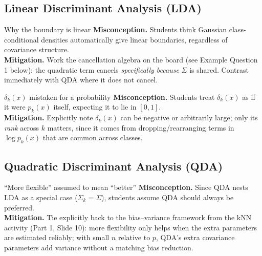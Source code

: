 \documentclass[11pt]{article}
\begin{document}
\subsection{Linear Discriminant Analysis (LDA)}
\begin{diffconcept}{Why the boundary is linear}
\textbf{Misconception.} Students think Gaussian class-conditional densities automatically give linear boundaries, regardless of covariance structure. \\
\textbf{Mitigation.} Work the cancellation algebra on the board (see Example Question 1 below): the quadratic term cancels \emph{specifically because} $\Sigma$ is shared. Contrast immediately with QDA where it does not cancel.
\end{diffconcept}
\begin{diffconcept}{$\delta_k(x)$ mistaken for a probability}
\textbf{Misconception.} Students treat $\delta_k(x)$ as if it were $p_k(x)$ itself, expecting it to lie in $[0,1]$. \\
\textbf{Mitigation.} Explicitly note $\delta_k(x)$ can be negative or arbitrarily large; only its \emph{rank} across $k$ matters, since it comes from dropping/rearranging terms in $\log p_k(x)$ that are common across classes.
\end{diffconcept}

\subsection{Quadratic Discriminant Analysis (QDA)}
\begin{diffconcept}{``More flexible'' assumed to mean ``better''}
\textbf{Misconception.} Since QDA nests LDA as a special case ($\Sigma_k=\Sigma$), students assume QDA should always be preferred. \\
\textbf{Mitigation.} Tie explicitly back to the bias--variance framework from the kNN activity (Part 1, Slide 10): more flexibility only helps when the extra parameters are estimated reliably; with small $n$ relative to $p$, QDA's extra covariance parameters add variance without a matching bias reduction.
\end{diffconcept}
\end{document}
